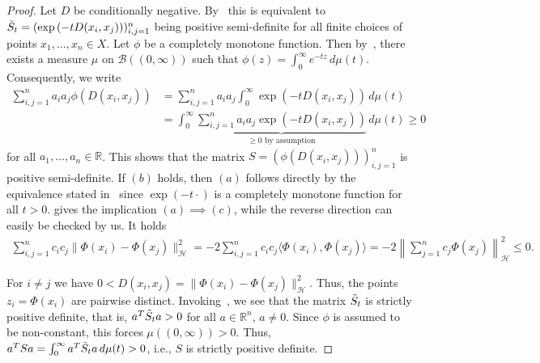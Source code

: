 \begin{proof}
    Let $D$ be conditionally negative. By~\cite[Theorem~2.2]{berg_harmonic_1984} this is equivalent to $\Tilde{S}_t=(\exp{(-tD(x_i,x_j))})_{i,j=1}^{n}$ being positive semi-definite for all finite choices of points $x_1,\dots,x_n\in X$. Let $\phi$ be a completely monotone function. Then by~\cite[Corollary~6.14]{berg_harmonic_1984}, there exists a measure $\mu$ on $\mathcal{B}((0,\infty))$ such that $\phi(z)=\int_0^{\infty}e^{-tz}\,d\mu(t)$. Consequently, we write
    \begin{align*}
        \sum_{i,j=1}^{n}a_ia_j\phi(D(x_i,x_j))&=\sum_{i,j=1}^{n}a_ia_j\int_{0}^{\infty}\exp{(-tD(x_i,x_j))}\,d\mu(t)\\&
        =\int_{0}^{\infty}\underbrace{\sum_{i,j=1}^{n}a_ia_j\exp{(-tD(x_i,x_j))}}_{\ge0\text{ by assumption}}\,d\mu(t)\ge0
    \end{align*}
    for all $a_1,\dots,a_n\in\mathbb{R}$. This shows that the matrix $S=(\phi(D(x_i,x_j)))_{i,j=1}^{n}$ is positive semi-definite. If $(b)$ holds, then $(a)$ follows directly by the equivalence stated in~\cite[Theorem~2.2]{berg_harmonic_1984} since $\exp{(-t\cdot)}$ is a completely monotone function for all $t>0$.\cite[Proposition~3.2]{berg_harmonic_1984} gives the implication $(a)\implies (c)$, while the reverse direction can easily be checked by us. It holds
    \begin{align*}
        \sum_{i,j=1}^{n}c_ic_j\|\Phi(x_i)-\Phi(x_j)\|_{\mathcal{H}}^2=-2\sum_{i,j=1}^{n}c_ic_j\langle\Phi(x_i),\Phi(x_j)\rangle=-2\left\|\sum_{j=1}^{n}c_j\Phi(x_j)\right\|_{\mathcal{H}}^{2}\le0.
    \end{align*}

    For $i\ne j$ we have $0<D(x_i,x_j)=\|\Phi(x_i)-\Phi(x_j)\|_{\mathcal{H}}^{2}$. Thus, the points $z_i=\Phi(x_i)$ are pairwise distinct. Invoking~\cite[Theorem~3.1]{guella_gaussian_2022}, we see that the matrix $\Tilde{S}_t$ is strictly positive definite, that is, $a^T\Tilde{S}_ta>0$ for all $a\in\mathbb{R}^{n}$, $a\ne0$. Since $\phi$ is assumed to be non-constant, this forces $\mu((0,\infty))>0$. Thus, $a^{T}Sa=\int_{0}^{\infty}a^{T}\Tilde{S}_ta\,d\mu(t)>0$, i.e., $S$ is strictly positive definite.
\end{proof}

